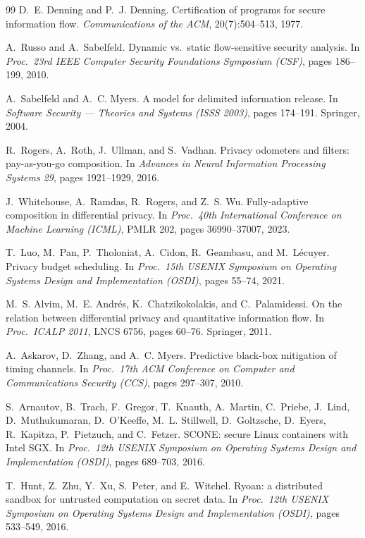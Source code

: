 \documentclass[11pt,a4paper]{article}
\theoremstyle{definition}
\begin{document}
\begin{thebibliography}{99}
 D.~E. Denning and P.~J. Denning. Certification of programs for secure
information flow. \emph{Communications of the ACM}, 20(7):504--513, 1977.

 A.~Russo and A.~Sabelfeld. Dynamic vs.\ static flow-sensitive security analysis. In
\emph{Proc.\ 23rd IEEE Computer Security Foundations Symposium (CSF)}, pages 186--199, 2010.

 A.~Sabelfeld and A.~C. Myers. A model for delimited information release. In
\emph{Software Security --- Theories and Systems (ISSS 2003)}, pages 174--191. Springer, 2004.

 R.~Rogers, A.~Roth, J.~Ullman, and S.~Vadhan. Privacy odometers and filters:
pay-as-you-go composition. In \emph{Advances in Neural Information Processing Systems 29}, pages
1921--1929, 2016.

 J.~Whitehouse, A.~Ramdas, R.~Rogers, and Z.~S. Wu. Fully-adaptive composition in
differential privacy. In \emph{Proc.\ 40th International Conference on Machine Learning (ICML)},
PMLR 202, pages 36990--37007, 2023.

 T.~Luo, M.~Pan, P.~Tholoniat, A.~Cidon, R.~Geambasu, and M.~L\'ecuyer. Privacy
budget scheduling. In \emph{Proc.\ 15th USENIX Symposium on Operating Systems Design and
Implementation (OSDI)}, pages 55--74, 2021.

 M.~S. Alvim, M.~E. Andr\'es, K.~Chatzikokolakis, and C.~Palamidessi. On the
relation between differential privacy and quantitative information flow. In \emph{Proc.\ ICALP
2011}, LNCS 6756, pages 60--76. Springer, 2011.

 A.~Askarov, D.~Zhang, and A.~C. Myers. Predictive black-box mitigation of timing
channels. In \emph{Proc.\ 17th ACM Conference on Computer and Communications Security (CCS)},
pages 297--307, 2010.

 S.~Arnautov, B.~Trach, F.~Gregor, T.~Knauth, A.~Martin, C.~Priebe, J.~Lind,
D.~Muthukumaran, D.~O'Keeffe, M.~L. Stillwell, D.~Goltzsche, D.~Eyers, R.~Kapitza, P.~Pietzuch,
and C.~Fetzer. SCONE: secure Linux containers with Intel SGX. In \emph{Proc.\ 12th USENIX
Symposium on Operating Systems Design and Implementation (OSDI)}, pages 689--703, 2016.

 T.~Hunt, Z.~Zhu, Y.~Xu, S.~Peter, and E.~Witchel. Ryoan: a distributed sandbox for
untrusted computation on secret data. In \emph{Proc.\ 12th USENIX Symposium on Operating Systems
Design and Implementation (OSDI)}, pages 533--549, 2016.


\end{thebibliography}
\end{document}
